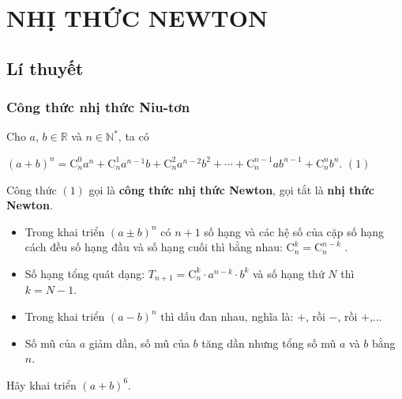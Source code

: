 \section{NHỊ THỨC NEWTON}

\subsection{Lí thuyết}

\subsubsection{Công thức nhị thức Niu-tơn}

\begin{dn}
	Cho $a$, $b\in\mathbb{R}$ và $n\in\mathbb{N}^*$, ta có
	\begin{center}
		$(a+b)^n=\mathrm{C}_n^0a^n+\mathrm{C}_n^1a^{n-1}b+\mathrm{C}_n^2a^{n-2}b^2+\cdots +\mathrm{C}_n^{n-1}ab^{n-1}+\mathrm{C}_n^nb^n.$ \quad $(1)$
	\end{center}
	Công thức $(1)$ gọi là \textbf{công thức nhị thức Newton}, gọi tắt là \textbf{nhị thức Newton}.
\end{dn}

\begin{nx}
	\begin{itemize}
		\item Trong khai triển $(a \pm b)^{n} $ có $n+1$ số hạng và các hệ số của cặp số hạng cách đều số hạng đầu và số hạng cuối thì bằng nhau: $\mathrm{C}^{k}_n = \mathrm{C}^{n-k}_n $ .
		\item Số hạng tổng quát dạng: $T_{n+1} = \mathrm{C}^{k}_n \cdot a^{n-k} \cdot b^{k} $ và số hạng thứ $N$ thì $k = N - 1$.
		\item Trong khai triển  $(a - b)^{n} $ thì dấu đan nhau, nghĩa là: $+$, rồi $-$, rồi $+$,...
		\item Số mũ của $a$ giảm dần, số mũ của $b$ tăng dần nhưng tổng số mũ $a$ và $b$ bằng $n$.
	\end{itemize}
\end{nx}

\begin{vd}%
	Hãy khai triển $\left(a+b\right)^6$.
\end{vd}

